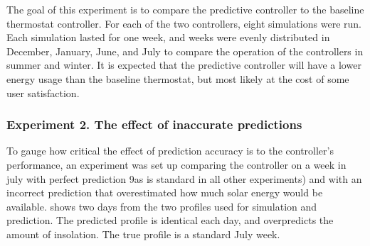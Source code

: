 The goal of this experiment is to compare the predictive controller to the baseline thermostat controller.
For each of the two controllers, eight simulations were run.
Each simulation lasted for one week, and weeks were evenly distributed in December, January, June, and July to compare the operation of the controllers in summer and winter.
It is expected that the predictive controller will have a lower energy usage than the baseline thermostat, but most likely at the cost of some user satisfaction.

\subsubsection{Experiment 2. The effect of inaccurate predictions}

To gauge how critical the effect of prediction accuracy is to the controller's performance, an experiment was set up comparing the controller on a week in july with perfect prediction 9as is standard in all other experiments) and with an incorrect prediction that overestimated how much solar energy would be available.
 shows two days from the two profiles used for simulation and prediction.
The predicted profile is identical each day, and overpredicts the amount of insolation.
The true profile is a standard July week.


